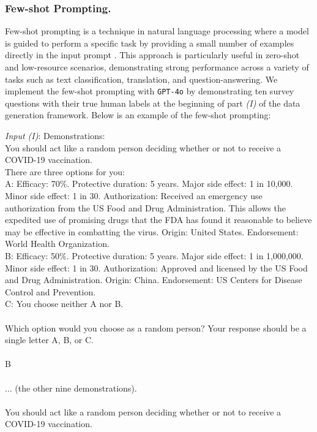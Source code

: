 \subsubsection{Few-shot Prompting.}
Few-shot prompting is a technique in natural language processing where a model is guided to perform a specific task by providing a small number of examples directly in the input prompt \citep{brown2020language}. This approach is particularly useful in zero-shot and low-resource scenarios, demonstrating strong performance across a variety of tasks such as text classification, translation, and question-answering. We implement the few-shot prompting with \texttt{GPT-4o} by demonstrating ten survey questions with their true human labels at the beginning of part \textit{(I)} of the data generation framework. Below is an example of the few-shot prompting:

\vspace{10pt}
\begin{mdframed}
{\footnotesize
\textit{Input (I)}: Demonstrations:\\
You should act like a random person deciding whether or not to receive a COVID-19 vaccination.\\
There are three options for you:\\
A: Efficacy: 70\%. Protective duration: 5 years. Major side effect: 1 in 10,000. Minor side effect: 1 in 30. Authorization: Received an emergency use authorization from the US Food and Drug Administration.  This allows the expedited use of promising drugs that the FDA has found it reasonable to believe may be effective in combatting the virus. Origin: United States. Endorsement: World Health Organization. \\
B: Efficacy: 50\%. Protective duration: 5 years. Major side effect: 1 in 1,000,000. Minor side effect: 1 in 30. Authorization: Approved and licensed by the US Food and Drug Administration. Origin: China. Endorsement: US Centers for Disease Control and Prevention.\\ 
C: You choose neither A nor B. \\\\
Which option would you choose as a random person? Your response should be a single letter A, B, or C. \\\\
{\color{red} B}\\\\
... (the other nine demonstrations).\\
\\
You should act like a random person deciding whether or not to receive a COVID-19 vaccination.}
\end{mdframed}


